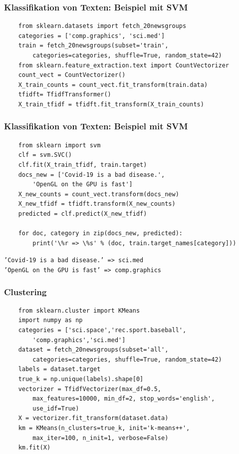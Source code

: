 \begin{frame}[fragile]
    \frametitle{Klassifikation von Texten: Beispiel mit SVM}
    
    \begin{verbatim}
    from sklearn.datasets import fetch_20newsgroups
    categories = ['comp.graphics', 'sci.med']
    train = fetch_20newsgroups(subset='train',
        categories=categories, shuffle=True, random_state=42)
    from sklearn.feature_extraction.text import CountVectorizer
    count_vect = CountVectorizer()
    X_train_counts = count_vect.fit_transform(train.data)
    tfidft= TfidfTransformer()
    X_train_tfidf = tfidft.fit_transform(X_train_counts)
    \end{verbatim}
\end{frame}
    
    
\begin{frame}[fragile]
    \frametitle{Klassifikation von Texten: Beispiel mit SVM}
    
    \begin{verbatim}
    from sklearn import svm
    clf = svm.SVC()
    clf.fit(X_train_tfidf, train.target)
    docs_new = ['Covid-19 is a bad disease.', 
        'OpenGL on the GPU is fast']
    X_new_counts = count_vect.transform(docs_new)
    X_new_tfidf = tfidft.transform(X_new_counts)
    predicted = clf.predict(X_new_tfidf)
    
    for doc, category in zip(docs_new, predicted):
        print('\%r => \%s' % (doc, train.target_names[category]))
    \end{verbatim}
    
    \texttt{'Covid-19 is a bad disease.' => sci.med}\\
    \texttt{'OpenGL on the GPU is fast' => comp.graphics}
    
\end{frame}
    

\begin{frame}[fragile]
    \frametitle{Clustering}

    \begin{verbatim}
    from sklearn.cluster import KMeans
    import numpy as np
    categories = ['sci.space','rec.sport.baseball',
        'comp.graphics','sci.med']
    dataset = fetch_20newsgroups(subset='all', 
        categories=categories, shuffle=True, random_state=42)
    labels = dataset.target
    true_k = np.unique(labels).shape[0]
    vectorizer = TfidfVectorizer(max_df=0.5,
        max_features=10000, min_df=2, stop_words='english', 
        use_idf=True)
    X = vectorizer.fit_transform(dataset.data)
    km = KMeans(n_clusters=true_k, init='k-means++',
        max_iter=100, n_init=1, verbose=False)
    km.fit(X)
    \end{verbatim}
\end{frame}
    
